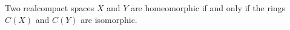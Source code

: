 Two realcompact spaces $X$ and $Y$ are homeomorphic if and only if the rings $C(X)$ and $C(Y)$ are isomorphic.
